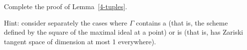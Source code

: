 \begin{exercise}\label{nonred 4-tuples}\label{ex7.8}
Complete the proof of Lemma~\ref{4-tuples}.

Hint: consider separately the cases where $\Gamma$ contains a
%
(that is, the scheme defined by the square of the maximal ideal at a
point) or is
%
(that is, has Zariski tangent space of
dimension at most 1 everywhere).
\end{exercise}




